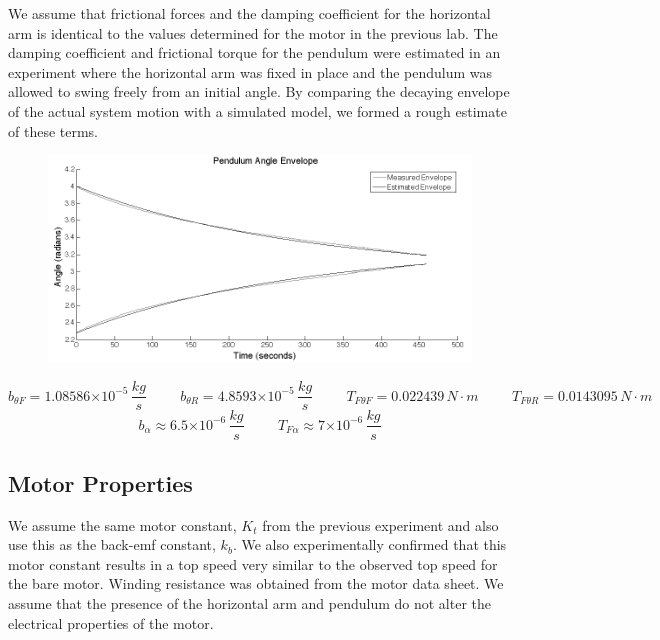 \documentclass{article}
\theoremstyle{plain}
\theoremstyle{definition}
\theoremstyle{remark}
\providecommand{\e}[1]{\ensuremath{\times 10^{#1}}}
\begin{document}
We assume that frictional forces and the damping coefficient for the horizontal arm is identical to the values determined for the motor in the previous lab.  The damping coefficient and frictional torque for the pendulum were estimated in an experiment where the horizontal arm was fixed in place and the pendulum was allowed to swing freely from an initial angle.  By comparing the decaying envelope of the actual system motion with a simulated model, we formed a rough estimate of these terms. 

\begin{figure}
\begin{center}
\includegraphics[width = 16cm]{pendulumEnvelope.png}
\end{center}
\label{Actual Decaying Envelope of motion vs Simulated Envelope}
\end{figure}

$$ b_{\theta F} = 1.08586 \e{-5} \, \frac{kg}{s} \hspace{1cm} b_{\theta R} = 4.8593\e{-5} \, \frac{kg}{s} \hspace{1cm} T_{F \theta F} = 0.022439 \, N \cdot m \hspace{1cm} T_{F \theta R} = 0.0143095 \, N \cdot m$$
$$ b_{\alpha} \approx 6.5 \e{-6} \, \frac{kg}{s} \hspace{1cm} T_{F \alpha} \approx 7\e{-6} \, \frac{kg}{s}$$

\subsection*{Motor Properties}

We assume the same motor constant, $K_t$ from the previous experiment and also use this as the back-emf constant, $k_b$.  We also experimentally confirmed that this motor constant results in a top speed very similar to the observed top speed for the bare motor.  Winding resistance was obtained from the motor data sheet.  We assume that the presence of the horizontal arm and pendulum do not alter the electrical properties of the motor.  
\end{document}

